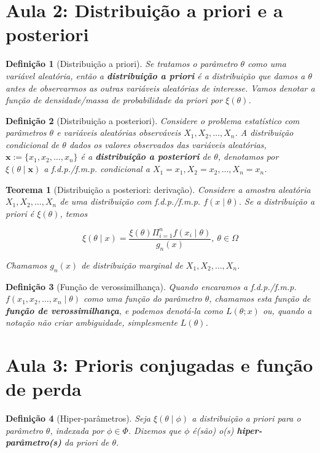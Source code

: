 \documentclass{article}
\newtheorem{theorem}{Teorema}
\newtheorem{definition}{Definição}
\begin{document}
	\section*{Aula 2:  Distribuição a priori e a posteriori}
	\label{s2}
	\begin{definition}[Distribuição a priori]
		Se tratamos o parâmetro $\theta$ como uma variável aleatória, então a \textbf{distribuição a priori} é a distribuição que damos a $\theta$ antes de observarmos as outras variáveis aleatórias de interesse. Vamos denotar a função de densidade/massa de probabilidade da priori por $\xi(\theta)$.
	\end{definition}
	
	\begin{definition}[Distribuição a posteriori]
		Considere o problema estatístico com parâmetros $\theta$ e variáveis aleatórias observáveis $X_1, X_2, \ldots, X_n$. A distribuição condicional de $\theta$ dados os valores observados das variáveis aleatórias, $\textbf{x} := \{x_1, x_2, \ldots, x_n\}$ é a \textbf{distribuição a posteriori} de $\theta$, denotamos por $\xi(\theta \mid \textbf{x})$ a f.d.p./f.m.p. condicional a $X_1 = x_1, X_2 = x_2, \ldots, X_n = x_n$.
	\end{definition}
	
	\begin{theorem}[Distribuição a posteriori: derivação]
		Considere a amostra aleatória $X_1, X_2, \ldots, X_n$ de uma distribuição com f.d.p./f.m.p. $f(x \mid \theta)$. Se a distribuição a priori é $\xi(\theta)$, temos
		
		\begin{equation}
			\xi(\theta \mid x) = \frac{\xi(\theta) \Pi_{i = 1}^{n} f(x_i \mid \theta)}{g_n(x)}, \ \theta \in \Omega
		\end{equation}
		
		Chamamos $g_n(x)$ de distribuição marginal de $X_1, X_2, \ldots, X_n$.
	\end{theorem}
	
	\begin{definition}[Função de verossimilhança]
		Quando encaramos a f.d.p./f.m.p. $f(x_1, x_2, \ldots, x_n \mid \theta)$ como uma função do parâmetro $\theta$, chamamos esta função de \textbf{função de verossimilhança}, e podemos denotá-la como $L(\theta; x)$ ou, quando a notação não criar ambiguidade, simplesmente $L(\theta)$.
	\end{definition}
	
	\section*{Aula 3: Prioris conjugadas e função de perda}
	\label{s3}
	\begin{definition}[Hiper-parâmetros]
		Seja $\xi(\theta \mid \phi)$ a distribuição a priori para o parâmetro $\theta$, indexada por $\phi \in \Phi$. Dizemos que $\phi$ é(são) o(s) \textbf{hiper-parâmetro(s)} da priori de $\theta$.
	\end{definition}
	
\end{document}
